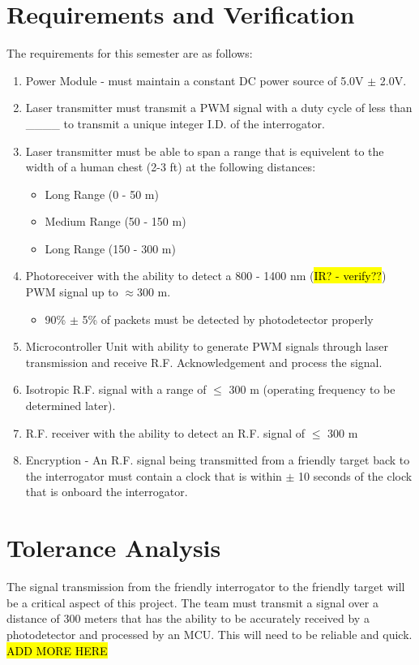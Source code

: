 \documentclass[openbib,letterpaper,10pt]{article}
\begin{document}
\begin{spacing}{1.15}
\section{Requirements and Verification}
The requirements for this semester are as follows: 
\begin{enumerate}
	\item Power Module - must maintain a constant DC power source of  5.0V $\pm$ 2.0V.
	\item Laser transmitter must transmit a PWM signal with a duty cycle of less than \_\_<insert numerical value here>\_\_ to transmit a unique integer I.D. of the interrogator.
	\item Laser transmitter must be able to span a range that is equivelent to the width of a human chest (2-3 ft) at the following distances:
		\begin{itemize}
			\item Long Range (0 - 50 m)
			\item Medium Range (50 - 150 m)
			\item Long Range (150 - 300 m)
		\end{itemize}
	\item Photoreceiver with the ability to detect a 800 - 1400 nm (\hl{IR? - verify??}) PWM signal up to $\approx$300 m.
		\begin{itemize}
			\item 90\% $\pm$ 5\% of packets must be detected by photodetector properly
		\end{itemize}
	\item Microcontroller Unit with ability to generate PWM signals through laser transmission and receive R.F. Acknowledgement and process the signal.
	\item Isotropic R.F. signal with a range of $\leq$ 300 m (operating frequency to be determined later).
	\item R.F. receiver with the ability to detect an R.F. signal of $\leq$ 300 m
	\item Encryption - An R.F. signal being transmitted from a friendly target back to the interrogator must contain a clock that is within $\pm$ 10 seconds of the clock that is onboard the interrogator.
\end{enumerate}

\section{Tolerance Analysis}
The signal transmission from the friendly interrogator to the friendly target will be a critical aspect of this project. The team must transmit a signal over a distance of 300 meters that has the ability to be accurately received by a photodetector and processed by an MCU. This will need to be reliable and quick. \hl{ADD MORE HERE}



\end{spacing}
\end{document}
